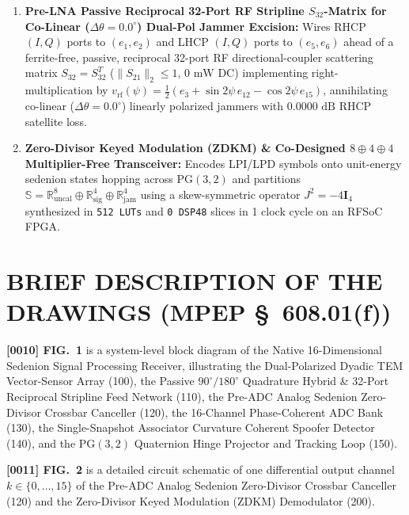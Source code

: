 \documentclass[12pt,letterpaper]{article}
\begin{document}
\begin{enumerate}[leftmargin=18pt,itemsep=2pt]
    \item \textbf{Pre-LNA Passive Reciprocal 32-Port RF Stripline $S_{32}$-Matrix for Co-Linear ($\Delta\theta = 0.0^\circ$) Dual-Pol Jammer Excision:} Wires RHCP $(I,Q)$ ports to $(e_1,e_2)$ and LHCP $(I,Q)$ ports to $(e_5,e_6)$ ahead of a ferrite-free, passive, reciprocal 32-port RF directional-coupler scattering matrix $S_{32} = S_{32}^T$ ($\|S_{21}\|_2 \le 1$, $0\text{ mW}$ DC) implementing right-multiplication by $v_{\mathrm{rf}}(\psi) = \frac{1}{2}(e_3 + \sin 2\psi\,e_{12} - \cos 2\psi\,e_{15})$, annihilating co-linear ($\Delta\theta = 0.0^\circ$) linearly polarized jammers with $0.0000\text{ dB}$ RHCP satellite loss.
    \item \textbf{Zero-Divisor Keyed Modulation (ZDKM) \& Co-Designed $8\oplus 4\oplus 4$ Multiplier-Free Transceiver:} Encodes LPI/LPD symbols onto unit-energy sedenion states hopping across $\mathrm{PG}(3,2)$ and partitions $\mathbb{S} = \mathbb{R}^8_{\mathrm{uncal}} \oplus \mathbb{R}^4_{\mathrm{sig}} \oplus \mathbb{R}^4_{\mathrm{jam}}$ using a skew-symmetric operator $J^2 = -4\mathbf{I}_4$ synthesized in \texttt{512 LUTs} and \texttt{0 DSP48} slices in 1 clock cycle on an RFSoC FPGA.
\end{enumerate}

\newpage
\section*{BRIEF DESCRIPTION OF THE DRAWINGS (MPEP \S\ 608.01(f))}
\textbf{[0010] FIG.\ 1} is a system-level block diagram of the Native 16-Dimensional Sedenion Signal Processing Receiver, illustrating the Dual-Polarized Dyadic TEM Vector-Sensor Array (100), the Passive $90^\circ/180^\circ$ Quadrature Hybrid \& 32-Port Reciprocal Stripline Feed Network (110), the Pre-ADC Analog Sedenion Zero-Divisor Crossbar Canceller (120), the 16-Channel Phase-Coherent ADC Bank (130), the Single-Snapshot Associator Curvature Coherent Spoofer Detector (140), and the $\mathrm{PG}(3,2)$ Quaternion Hinge Projector and Tracking Loop (150).

\textbf{[0011] FIG.\ 2} is a detailed circuit schematic of one differential output channel $k \in \{0,\dots,15\}$ of the Pre-ADC Analog Sedenion Zero-Divisor Crossbar Canceller (120) and the Zero-Divisor Keyed Modulation (ZDKM) Demodulator (200).
\end{document}
